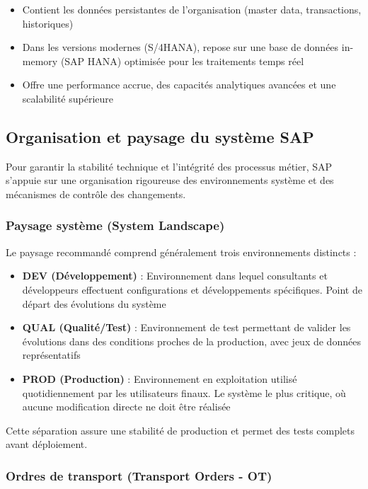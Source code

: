 \documentclass[12pt,a4paper,oneside]{report}
\begin{document}
\begin{itemize}[label=---, itemsep=0.15em]
	\item Contient les données persistantes de l'organisation (master data, transactions, historiques)
	\item Dans les versions modernes (S/4HANA), repose sur une base de données in-memory (SAP HANA) optimisée pour les traitements temps réel
	\item Offre une performance accrue, des capacités analytiques avancées et une scalabilité supérieure
\end{itemize}

\subsection{Organisation et paysage du système SAP}\label{ch2:mm-paysage-systeme}

Pour garantir la stabilité technique et l'intégrité des processus métier, SAP s'appuie sur une organisation 
rigoureuse des environnements système et des mécanismes de contrôle des changements.

\subsubsection{Paysage système (System Landscape)}\label{ch2:mm-landscape}

Le paysage recommandé comprend généralement trois environnements distincts :

\begin{itemize}[label=\textbullet, itemsep=0.2em]
	\item \textbf{DEV (Développement)} : Environnement dans lequel consultants et développeurs effectuent configurations et développements spécifiques. Point de départ des évolutions du système
	\item \textbf{QUAL (Qualité/Test)} : Environnement de test permettant de valider les évolutions dans des conditions proches de la production, avec jeux de données représentatifs
	\item \textbf{PROD (Production)} : Environnement en exploitation utilisé quotidiennement par les utilisateurs finaux. Le système le plus critique, où aucune modification directe ne doit être réalisée
\end{itemize}

Cette séparation assure une stabilité de production et permet des tests complets avant déploiement.

\subsubsection{Ordres de transport (Transport Orders - OT)}\label{ch2:mm-transport-orders}
\end{document}
